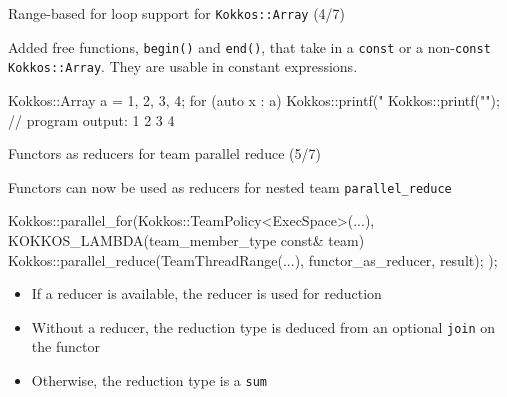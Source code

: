 \begin{frame}[fragile]{Range-based for loop support for \texttt{Kokkos::Array} (4/7)}

Added free functions, \texttt{begin()} and \texttt{end()}, that take in a \texttt{const} or a non-\texttt{const} \texttt{Kokkos::Array}.
They are usable in constant expressions.

\vspace{5pt}

\begin{code}
  Kokkos::Array a = {1, 2, 3, 4};
  for (auto x : a)
    Kokkos::printf("%
  Kokkos::printf("\n");
  // program output: 1 2 3 4 
\end{code}

%  
%  
%  

\end{frame}


\begin{frame}[fragile]{Functors as reducers for team parallel reduce (5/7)}

Functors can now be used as reducers for nested team \texttt{parallel\_reduce}
  
\vspace{5pt}

\begin{code}
  Kokkos::parallel_for(Kokkos::TeamPolicy<ExecSpace>(...),
  KOKKOS_LAMBDA(team_member_type const& team) {
    Kokkos::parallel_reduce(TeamThreadRange(...),
                            functor_as_reducer{}, result);
  });
\end{code}

\begin{itemize}
\vspace{10pt}

\item If a reducer is available, the reducer is used for reduction
\item Without a reducer, the reduction type is deduced from an optional \texttt{join} on the functor
\item Otherwise, the reduction type is a \texttt{sum}

\end{itemize}
\end{frame}

